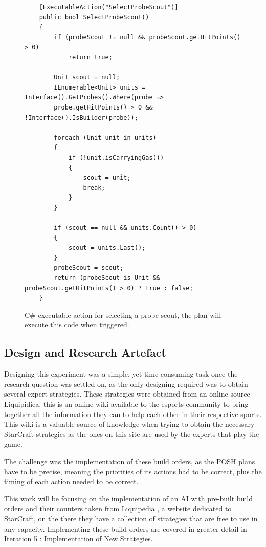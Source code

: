 \documentclass[journal]{IEEEtran}
\begin{document}
\begin{figure}
	\begin{lstlisting}
    [ExecutableAction("SelectProbeScout")]
    public bool SelectProbeScout()
    {
        if (probeScout != null && probeScout.getHitPoints() > 0)
            return true;

        Unit scout = null;
        IEnumerable<Unit> units = Interface().GetProbes().Where(probe =>
        probe.getHitPoints() > 0 && !Interface().IsBuilder(probe));

        foreach (Unit unit in units)
        {
            if (!unit.isCarryingGas())
            {
                scout = unit;
                break;
            }
        }
        
        if (scout == null && units.Count() > 0)
        {
            scout = units.Last();
        }
        probeScout = scout;
        return (probeScout is Unit && probeScout.getHitPoints() > 0) ? true : false;
    }
\end{lstlisting}
	\caption{C\# executable action for selecting a probe scout, the plan will execute this code when triggered.}
	\label{Fi4}
\end{figure}

\subsection{Design and Research Artefact}
Designing this experiment was a simple, yet time consuming task once the research question was settled on, as the only designing required was to obtain several expert strategies. These strategies were obtained from an online source Liquipidiea, this is an online wiki available to the esports community to bring together all the information they can to help each other in their respective sports. This wiki is a valuable source of knowledge when trying to obtain the necessary StarCraft strategies as the ones on this site are used by the experts that play the game. 

The challenge was the implementation of these build orders, as the POSH plans have to be precise, meaning the priorities of its actions had to be correct, plus the timing of each action needed to be correct. 

This work will be focusing on the implementation of an AI with pre-built build orders and their counters taken from Liquipedia \cite{Liquid}, a website dedicated to StarCraft, on the there they have a collection of strategies that are free to use in any capacity. Implementing these build orders are covered in greater detail in Iteration 5 : Implementation of New Strategies.
\end{document}
